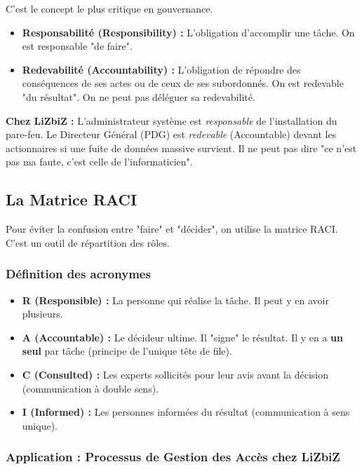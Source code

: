 C'est le concept le plus critique en gouvernance.

\begin{itemize}
    \item \textbf{Responsabilité (Responsibility) :} L'obligation d'accomplir une tâche. On est responsable "de faire".
    \item \textbf{Redevabilité (Accountability) :} L'obligation de répondre des conséquences de ses actes ou de ceux de ses subordonnés. On est redevable "du résultat". On ne peut pas déléguer sa redevabilité.
\end{itemize}

\begin{boxlizbiz}
\textbf{Chez LiZbiZ :}
L'administrateur système est \textit{responsable} de l'installation du pare-feu. Le Directeur Général (PDG) est \textit{redevable} (Accountable) devant les actionnaires si une fuite de données massive survient. Il ne peut pas dire "ce n'est pas ma faute, c'est celle de l'informaticien".
\end{boxlizbiz}

\subsection{La Matrice RACI}

Pour éviter la confusion entre "faire" et "décider", on utilise la matrice RACI. C'est un outil de répartition des rôles.

\subsubsection{Définition des acronymes}

\begin{itemize}
    \item \textbf{R (Responsible) :} La personne qui réalise la tâche. Il peut y en avoir plusieurs.
    \item \textbf{A (Accountable) :} Le décideur ultime. Il "signe" le résultat. Il y en a \textbf{un seul} par tâche (principe de l'unique tête de file).
    \item \textbf{C (Consulted) :} Les experts sollicités pour leur avis avant la décision (communication à double sens).
    \item \textbf{I (Informed) :} Les personnes informées du résultat (communication à sens unique).
\end{itemize}

\subsubsection{Application : Processus de Gestion des Accès chez LiZbiZ}

